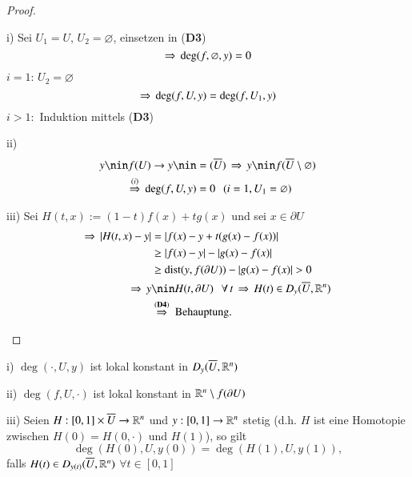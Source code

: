 \begin{proof}
    \begin{description}
    \item{i)}
    Sei $U_1=U$, $U_2=\varnothing$, einsetzen in (\textbf{D3})
    \[
        \Rightarrow \, \deg(f,\varnothing,y)=0
    \]
    $i=1$: $U_2=\varnothing$
    \[
        \Rightarrow \, \deg(f,U,y)=\deg(f,U_1,y)
    \]
    $i>1:$ Induktion mittels (\textbf{D3})
    \item{ii)}
    \begin{align*}
        y\nin f(U) \ra y \nin &=(\ol U)\, \Ra \, y\nin f(\ol U\setminus \varnothing)\\
        \overset{(i)}{\Ra } \, \deg (f,U,y)&=0 \qq (i=1, U_1=\varnothing)
    \end{align*}
    \item{iii)}
    Sei $H(t,x):=(1-t)f(x)+tg(x)$ und sei $x\in \partial U$
    \begin{align*}
        \Ra \, |H(t,x)-y|&= |f(x)-y+t(g(x)-f(x))|\\
            &\geq |f(x)-y| - |g(x)-f(x)|\\
            &\geq \dist(y,f(\partial U))- |g(x)-f(x)| >0\\
        \Ra \, y&\nin H(t,\partial U) \qq \forall \, t\,\Ra \,H(t)\in D_y(\ol U,\R^n)\\
        &\overset{(\textbf{D4})}{\Ra} \text{ Behauptung.}
    \end{align*}
    \end{description}
\end{proof}

\begin{theorem}
    \begin{description}
        \item{i)} $\deg(\cdot,U,y)$ ist lokal konstant in $D_y(\overline U,\mathbb{R}^n)$
        \item{ii)} $\deg(f,U,\cdot)$ ist lokal konstant in $\mathbb{R}^n\setminus f(\partial U)$
        \item{iii)} Seien $H:[0,1]\times \overline U\rightarrow \mathbb{R}^n$ und $y:[0,1]\rightarrow \mathbb{R}^n$ stetig (d.h. $H$ ist eine
            Homotopie zwischen $H(0)=H(0,\cdot)$ und $H(1)$), so gilt
        \[
            \deg(H(0),U,y(0))=\deg(H(1),U,y(1)),
        \]
        falls $H(t)\in D_{y(t)}(\overline U, \mathbb{R}^n)$ $\forall t \in [0,1]$
    \end{description}
\end{theorem}

